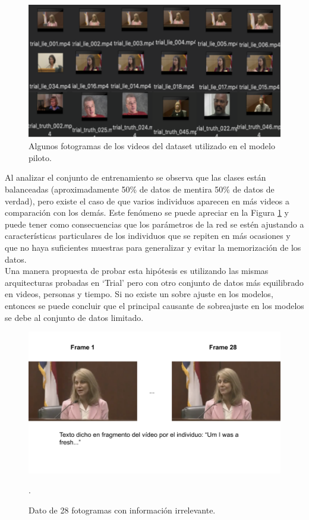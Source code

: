 \begin{onehalfspacing}
\begin{figure}[th]
	\centering
	\includegraphics[width=12cm,keepaspectratio]{XX_Figures/Fig_DatasetTrial_Problem.png}
	\caption{\footnotesize  Algunos fotogramas de los videos del dataset utilizado en el modelo piloto.}
	\label{fig:Fig_DatasetTrial_Problem}
\end{figure}

Al analizar el conjunto de entrenamiento se observa que las clases están balanceadas (aproximadamente 50\% de datos de mentira 50\% de datos de verdad), pero existe el caso de que varios individuos aparecen en más videos a comparación con los demás. Este fenómeno se puede apreciar en la Figura \ref{fig:Fig_DatasetTrial_Problem} y puede tener como consecuencias que los parámetros de la red se estén ajustando a características particulares de los individuos que se repiten en más ocasiones y que no haya suficientes muestras para generalizar y evitar la memorización de los datos.\\

Una manera propuesta de probar esta hipótesis es utilizando las mismas arquitecturas probadas en `Trial' pero con otro conjunto de datos más equilibrado en videos, personas y tiempo. Si no existe un sobre ajuste en los modelos, entonces se puede concluir que el principal causante de sobreajuste en los modelos se debe al conjunto de datos limitado.\\

\begin{figure}[h!]
	\centering
	\includegraphics[width=14cm,keepaspectratio]{XX_Figures/TextoFragmento28Frames.png}
	\caption{\footnotesize Dato de 28 fotogramas con información irrelevante.}.
	\label{fig:TextoFragmento28Frames}
\end{figure}



\end{onehalfspacing}
